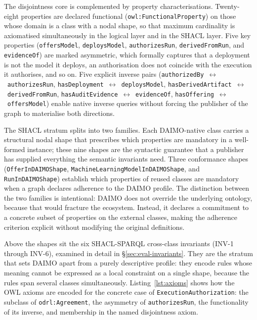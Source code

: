\documentclass[Afour,sagev,times]{sagej}
\newcommand{\code}[1]{\texttt{#1}}
\begin{document}
The disjointness core is complemented by property characterisations. Twenty-eight properties are declared functional (\code{owl:FunctionalProperty}) on those whose domain is a class with a nodal shape, so that maximum cardinality is axiomatised simultaneously in the logical layer and in the SHACL layer. Five key properties (\code{offersModel}, \code{deploysModel}, \code{authorizesRun}, \code{derivedFromRun}, and \code{evidenceOf}) are marked asymmetric, which formally captures that a deployment is not the model it deploys, an authorisation does not coincide with the execution it authorises, and so on. Five explicit inverse pairs (\code{authorizedBy}~$\leftrightarrow$~\code{authorizesRun}, \code{hasDeployment}~$\leftrightarrow$~\code{deploysModel}, \code{hasDerivedArtifact}~$\leftrightarrow$~\code{derivedFromRun}, \code{hasAuditEvidence}~$\leftrightarrow$~\code{evidenceOf}, \code{hasOffering}~$\leftrightarrow$~\code{offersModel}) enable native inverse queries without forcing the publisher of the graph to materialise both directions.

The SHACL stratum splits into two families. Each DAIMO-native class carries a structural nodal shape that prescribes which properties are mandatory in a well-formed instance; these nine shapes are the syntactic guarantee that a publisher has supplied everything the semantic invariants need. Three conformance shapes (\code{OfferInDAIMOShape}, \code{MachineLearningModelInDAIMOShape}, and \code{RunInDAIMOShape}) establish which properties of reused classes are mandatory when a graph declares adherence to the DAIMO profile. The distinction between the two families is intentional: DAIMO does not override the underlying ontology, because that would fracture the ecosystem. Instead, it declares a commitment to a concrete subset of properties on the external classes, making the adherence criterion explicit without modifying the original definitions.

Above the shapes sit the six SHACL-SPARQL cross-class invariants (INV-1 through INV-6), examined in detail in §\ref{sec:eval-invariants}. They are the stratum that sets DAIMO apart from a purely descriptive profile: they encode rules whose meaning cannot be expressed as a local constraint on a single shape, because the rules span several classes simultaneously. Listing~\ref{lst:axioms} shows how the OWL axioms are encoded for the concrete case of \code{ExecutionAuthorization}: the subclass of \code{odrl:Agreement}, the asymmetry of \code{authorizesRun}, the functionality of its inverse, and membership in the named disjointness axiom.
\end{document}
